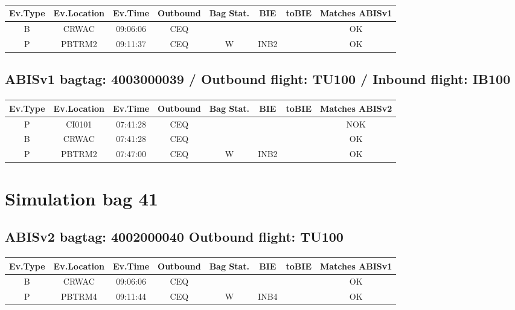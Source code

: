 \documentclass{report}
\begin{document}
\paragraph{}
\begin{longtable}{cccccccc}    \toprule
\rowcolor{white!50}
\textbf{Ev.Type} & \textbf{Ev.Location} & \textbf{Ev.Time} & \textbf{Outbound} & \textbf{Bag Stat.} & \textbf{BIE} & \textbf{toBIE} & \textbf{Matches ABISv1} \\\midrule
B & CRWAC & 09:06:06  & CEQ &  &  &  & OK\\
P & PBTRM2 & 09:11:37  & CEQ & W & INB2 &  & OK\\
\bottomrule
\end{longtable}
\subsection*{ABISv1 bagtag: 4003000039 / Outbound flight: TU100 / Inbound flight: IB100}
\paragraph{}
\begin{longtable}{cccccccc}    \toprule
\rowcolor{white!50}
\textbf{Ev.Type} & \textbf{Ev.Location} & \textbf{Ev.Time} & \textbf{Outbound} & \textbf{Bag Stat.} & \textbf{BIE} & \textbf{toBIE} & \textbf{Matches ABISv2} \\\midrule
P & CI0101 & 07:41:28  & CEQ &  &  &  & NOK\\
B & CRWAC & 07:41:28  & CEQ &  &  &  & OK\\
P & PBTRM2 & 07:47:00  & CEQ & W & INB2 &  & OK\\
\bottomrule
\end{longtable}
\pagebreak
\section*{Simulation bag 41}
\subsection*{ABISv2 bagtag: 4002000040 Outbound flight: TU100}
\paragraph{}
\begin{longtable}{cccccccc}    \toprule
\rowcolor{white!50}
\textbf{Ev.Type} & \textbf{Ev.Location} & \textbf{Ev.Time} & \textbf{Outbound} & \textbf{Bag Stat.} & \textbf{BIE} & \textbf{toBIE} & \textbf{Matches ABISv1} \\\midrule
B & CRWAC & 09:06:06  & CEQ &  &  &  & OK\\
P & PBTRM4 & 09:11:44  & CEQ & W & INB4 &  & OK\\
\bottomrule
\end{longtable}
\end{document}
